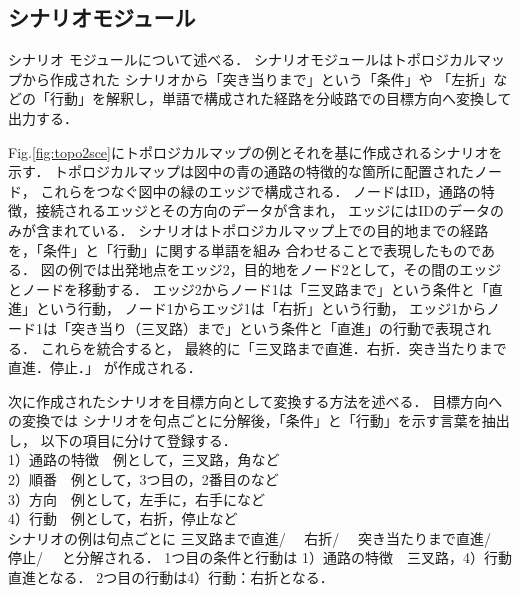 \documentclass{sice-si}
\begin{document}
\subsection{シナリオモジュール}
シナリオ
モジュールについて述べる．
シナリオモジュールはトポロジカルマップから作成された
シナリオから「突き当りまで」という「条件」や
「左折」などの「行動」を解釈し，単語で構成された経路を分岐路での目標方向へ変換して出力する．
\par
Fig.\ref{fig:topo2sce}にトポロジカルマップの例とそれを基に作成されるシナリオを示す．
トポロジカルマップは図中の青の通路の特徴的な箇所に配置されたノード，
これらをつなぐ図中の緑のエッジで構成される．
ノードはID，通路の特徴，接続されるエッジとその方向のデータが含まれ，
エッジにはIDのデータのみが含まれている．
シナリオはトポロジカルマップ上での目的地までの経路を，「条件」と「行動」に関する単語を組み
合わせることで表現したものである．
図の例では出発地点をエッジ2，目的地をノード2として，その間のエッジとノードを移動する．
エッジ2からノード1は「三叉路まで」という条件と「直進」という行動，
ノード1からエッジ1は「右折」という行動，
エッジ1からノード1は「突き当り（三叉路）まで」という条件と「直進」の行動で表現される．
これらを統合すると，
最終的に「三叉路まで直進．右折．突き当たりまで直進．停止．」
が作成される．\par
次に作成されたシナリオを目標方向として変換する方法を述べる．
目標方向への変換では
シナリオを句点ごとに分解後，「条件」と「行動」を示す言葉を抽出し，
以下の項目に分けて登録する．\\
1）通路の特徴　例として，三叉路，角など\\
2）順番　例として，3つ目の，2番目のなど\\
3）方向　例として，左手に，右手になど\\
4）行動　例として，右折，停止など\\
シナリオの例は句点ごとに
三叉路まで直進/　
右折/　
突き当たりまで直進/　
停止/　
と分解される．
1つ目の条件と行動は
1）通路の特徴　三叉路，4）行動　直進となる．
2つ目の行動は4）行動：右折となる．
\end{document}
